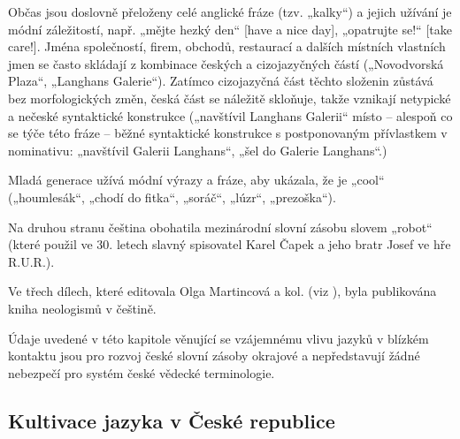 \documentclass[]{../../metanetpaper}
\begin{document}
\begin{multicols}{2}
Občas jsou doslovně přeloženy celé anglické fráze (tzv. „kalky“) a jejich užívání je módní záležitostí, např. „mějte hezký den“ {[}have a nice day{]}, „opatrujte se!“ {[}take care!{]}. Jména společností, firem, obchodů, restaurací a dalších místních vlastních jmen se často skládají z kombinace českých a cizojazyčných částí („Novodvorská Plaza“, „Langhans Galerie“). Zatímco cizojazyčná část těchto složenin zůstává bez morfologických změn, česká část se náležitě skloňuje, takže vznikají netypické a nečeské syntaktické konstrukce („navštívil Langhans Galerii“ místo – alespoň co se týče této fráze – běžné syntaktické konstrukce s postponovaným přívlastkem v nominativu: „navštívil Galerii Langhans“, „šel do Galerie Langhans“.)

Mladá generace užívá módní výrazy a fráze, aby ukázala, že je „cool“ („houmlesák“, „chodí do fitka“, „soráč“, „lúzr“, „prezoška“).

Na druhou stranu čeština obohatila mezinárodní slovní zásobu slovem „robot“ (které použil ve 30. letech slavný spisovatel Karel Čapek a jeho bratr Josef ve hře R.U.R.).

Ve třech dílech, které editovala Olga Martincová a kol. (viz \cite{Martincova_cs}), byla publikována kniha neologismů v češtině.

Údaje uvedené v této kapitole věnující se vzájemnému vlivu jazyků v blízkém kontaktu jsou pro rozvoj české slovní zásoby okrajové a nepředstavují žádné nebezpečí pro systém české vědecké terminologie.
  
\subsection{Kultivace jazyka v České republice}


\end{multicols}
\end{document}
